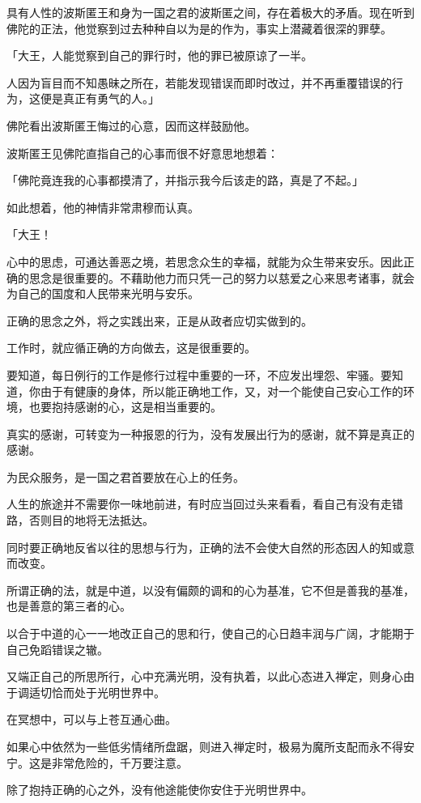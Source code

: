 \documentclass[twoside,openany]{book}
\begin{document}
具有人性的波斯匿王和身为一国之君的波斯匿之间，存在着极大的矛盾。现在听到佛陀的正法，他觉察到过去种种自以为是的作为，事实上潜藏着很深的罪孽。

「大王，人能觉察到自己的罪行时，他的罪已被原谅了一半。

人因为盲目而不知愚昧之所在，若能发现错误而即时改过，并不再重覆错误的行为，这便是真正有勇气的人。」

佛陀看出波斯匿王悔过的心意，因而这样鼓励他。

波斯匿王见佛陀直指自己的心事而很不好意思地想着：

「佛陀竟连我的心事都摸清了，并指示我今后该走的路，真是了不起。」

如此想着，他的神情非常肃穆而认真。

「大王！

心中的思虑，可通达善恶之境，若思念众生的幸福，就能为众生带来安乐。因此正确的思念是很重要的。不藉助他力而只凭一己的努力以慈爱之心来思考诸事，就会为自己的国度和人民带来光明与安乐。

正确的思念之外，将之实践出来，正是从政者应切实做到的。

工作时，就应循正确的方向做去，这是很重要的。

要知道，每日例行的工作是修行过程中重要的一环，不应发出埋怨、牢骚。要知道，你由于有健康的身体，所以能正确地工作，又，对一个能使自己安心工作的环境，也要抱持感谢的心，这是相当重要的。

真实的感谢，可转变为一种报恩的行为，没有发展出行为的感谢，就不算是真正的感谢。

为民众服务，是一国之君首要放在心上的任务。

人生的旅途并不需要你一味地前进，有时应当回过头来看看，看自己有没有走错路，否则目的地将无法抵达。

同时要正确地反省以往的思想与行为，正确的法不会使大自然的形态因人的知或意而改变。

所谓正确的法，就是中道，以没有偏颇的调和的心为基准，它不但是善我的基准，也是善意的第三者的心。

以合于中道的心一一地改正自己的思和行，使自己的心日趋丰润与广阔，才能期于自己免蹈错误之辙。

又端正自己的所思所行，心中充满光明，没有执着，以此心态进入禅定，则身心由于调适切恰而处于光明世界中。

在冥想中，可以与上苍互通心曲。

如果心中依然为一些低劣情绪所盘踞，则进入禅定时，极易为魔所支配而永不得安宁。这是非常危险的，千万要注意。

除了抱持正确的心之外，没有他途能使你安住于光明世界中。
\end{document}
